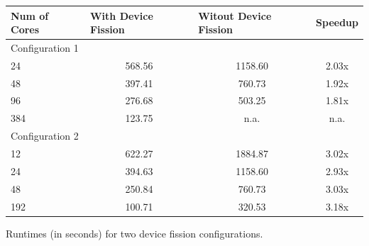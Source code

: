 \begin{tablehere}
{\footnotesize
\begin{tabular}{|p{}|p{}|p{}|p{}|}
\hline
       Num of Cores		& \multicolumn{1}{|p{1,55cm}}{With Device Fission}& \multicolumn{1}{|p{1,55cm}}{Witout Device Fission}& \multicolumn{1}{|p{1,55cm}|}{Speedup} \\ \hline
\multicolumn{1}{|l}{Configuration 1} & \multicolumn{1}{c}{}  & \multicolumn{1}{c}{}  & \multicolumn{1}{c|}{}  \\ \hline
      24  & \multicolumn{1}{|c}{568.56} & \multicolumn{1}{|c}{1158.60} & \multicolumn{1}{|c|}{2.03x} \\ \hline
			48  & \multicolumn{1}{|c}{397.41} & \multicolumn{1}{|c}{760.73} & \multicolumn{1}{|c|}{1.92x} \\ \hline
      96  & \multicolumn{1}{|c}{276.68} & \multicolumn{1}{|c}{503.25} & \multicolumn{1}{|c|}{1.81x} \\ \hline
      384  & \multicolumn{1}{|c}{123.75} & \multicolumn{1}{|c}{n.a.} & \multicolumn{1}{|c|}{n.a.} \\ \hline

\multicolumn{1}{|l}{Configuration 2} & \multicolumn{1}{l}{}  & \multicolumn{1}{l}{}  & \multicolumn{1}{l|}{}  \\ \hline
      12  & \multicolumn{1}{|c}{622.27} & \multicolumn{1}{|c}{1884.87} & \multicolumn{1}{|c|}{3.02x} \\ \hline
			24  & \multicolumn{1}{|c}{394.63} & \multicolumn{1}{|c}{1158.60} & \multicolumn{1}{|c|}{2.93x} \\ \hline
      48  & \multicolumn{1}{|c}{250.84} & \multicolumn{1}{|c}{760.73} & \multicolumn{1}{|c|}{3.03x} \\ \hline
      192  & \multicolumn{1}{|c}{100.71} & \multicolumn{1}{|c}{320.53} & \multicolumn{1}{|c|}{3.18x} \\ \hline
\end{tabular}}
  \caption{Runtimes (in seconds) for two device fission configurations.}
	\label{tab:LUDeviceFission}
\end{tablehere}


